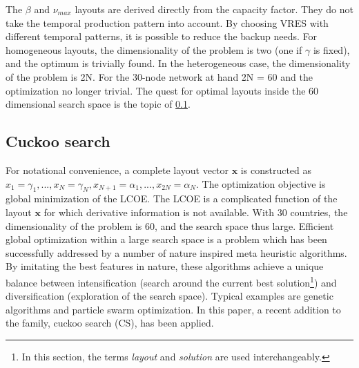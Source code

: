 \documentclass[a4paper, 12pt, sort&compress]{elsarticle}%
\begin{document}
The $\beta$ and $\nu_{max}$ layouts are derived directly from the capacity
factor. They do not take the temporal production pattern into
account. By choosing VRES with different temporal patterns, it is
possible to reduce the backup needs. For homogeneous layouts, the
dimensionality of the problem is two (one if $\gamma$ is fixed), and the
optimum is trivially found. In the heterogeneous case, the
dimensionality of the problem is 2N. For the 30-node network at hand
2N = 60 and the optimization no longer trivial. The quest for optimal
layouts inside the 60 dimensional search space is the topic of
\cref{sec:cuckoo-search}.

\subsection{Cuckoo search}
\label{sec:cuckoo-search}



For notational convenience, a complete layout vector $\boldsymbol x$
is constructed as
$x_{1} = \gamma_{1}, ..., x_{N} =\gamma_{N}, x_{N+1} = \alpha_{1}, ...,
x_{2N} = \alpha_{N}$.
The optimization objective is global minimization of the LCOE. The
LCOE is a complicated function of the layout $\boldsymbol x$ for which
derivative information is not available. With 30 countries, the
dimensionality of the problem is 60, and the search space thus
large. Efficient global optimization within a large search space is a
problem which has been successfully addressed by a number of nature
inspired meta heuristic algorithms. By imitating the best features in
nature, these algorithms achieve a unique balance between
intensification (search around the current best
solution\footnote{In this section, the terms \textit{layout} and
  \textit{solution} are used interchangeably.})
and diversification (exploration of the search space). Typical
examples are genetic algorithms\cite{Goldberg1989} and particle swarm
optimization\cite{Kennedy95}. In this paper, a recent
addition\cite{YangDeb} to the family, cuckoo search (CS), has been
applied.
\end{document}
